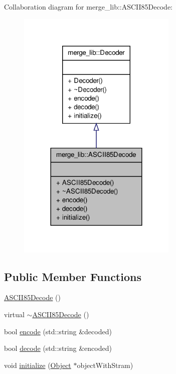 Collaboration diagram for merge\-\_\-lib\-:\-:A\-S\-C\-I\-I85\-Decode\-:
\nopagebreak
\begin{figure}[H]
\begin{center}
\leavevmode
\includegraphics[width=216pt]{da/d0c/classmerge__lib_1_1_a_s_c_i_i85_decode__coll__graph}
\end{center}
\end{figure}
\subsection*{Public Member Functions}
\begin{DoxyCompactItemize}
\item 
\hyperlink{classmerge__lib_1_1_a_s_c_i_i85_decode_ab7fecdf5132803f4c43ae35518287421}{A\-S\-C\-I\-I85\-Decode} ()
\item 
virtual \hyperlink{classmerge__lib_1_1_a_s_c_i_i85_decode_a3f3707199473f14d187d6c3f2832a692}{$\sim$\-A\-S\-C\-I\-I85\-Decode} ()
\item 
bool \hyperlink{classmerge__lib_1_1_a_s_c_i_i85_decode_ac1585d9cda91e81b798784cdb8083d0f}{encode} (std\-::string \&decoded)
\item 
bool \hyperlink{classmerge__lib_1_1_a_s_c_i_i85_decode_a25c34e2508ce567b33de3372ceac498a}{decode} (std\-::string \&encoded)
\item 
void \hyperlink{classmerge__lib_1_1_a_s_c_i_i85_decode_a2b5823d1959d29c7017880f74ebbf5f4}{initialize} (\hyperlink{classmerge__lib_1_1_object}{Object} $\ast$object\-With\-Stram)
\end{DoxyCompactItemize}


